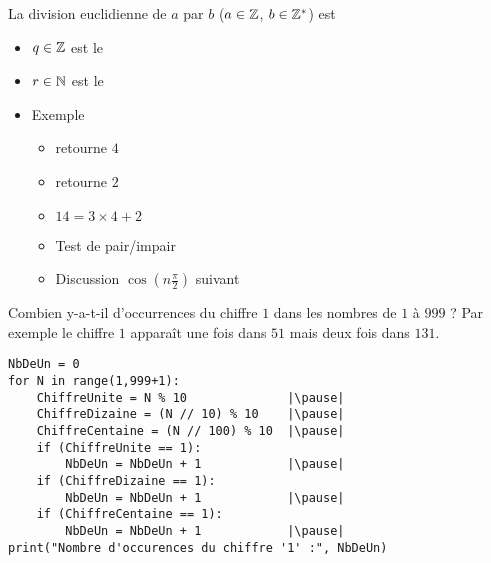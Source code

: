 \begin{frame}

La division euclidienne de $a$ par $b$ ($a \in \mathbb{Z}$, $b \in \mathbb{Z}^*$) est 

\pause

\begin{itemize}
  \item $q \in \mathbb{Z}$ est le  \pause  \qquad {}
\pause
  \item $r \in \mathbb{N}$ est le  \pause \qquad {}
\pause
  \item Exemple
  \begin{itemize}
    \item {} retourne $4$
\pause
    \item {} retourne $2$
\pause
    \item $14 = 3 \times 4 + 2$
\pause
    \item Test de pair/impair 
\pause
    \item Discussion $\cos( n\frac\pi2)$ suivant 
  \end{itemize}  
\end{itemize}

\end{frame}


\begin{frame}[fragile]

\begin{tp}
Combien y-a-t-il d’occurrences du chiffre $1$ dans les nombres de $1$ à $999$ ?   
Par exemple le chiffre $1$ apparaît une fois dans $51$ mais deux fois dans $131$.
\end{tp}

\pause

\begin{algo}[nb-un.py]
\small
\begin{lstlisting}
NbDeUn = 0
for N in range(1,999+1):
    ChiffreUnite = N % 10              |\pause|
    ChiffreDizaine = (N // 10) % 10    |\pause|
    ChiffreCentaine = (N // 100) % 10  |\pause| 
    if (ChiffreUnite == 1):
        NbDeUn = NbDeUn + 1            |\pause|  
    if (ChiffreDizaine == 1):
        NbDeUn = NbDeUn + 1            |\pause|   
    if (ChiffreCentaine == 1):
        NbDeUn = NbDeUn + 1            |\pause|  
print("Nombre d'occurences du chiffre '1' :", NbDeUn)
\end{lstlisting}  
\end{algo}

\end{frame}

